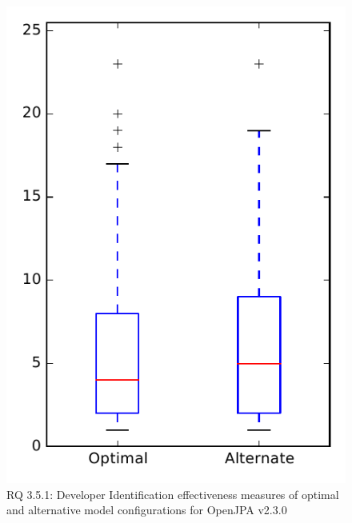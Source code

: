 
\begin{figure}
\centering
\includegraphics[height=0.4\textheight]{figures/combo/dit_rq1_openjpa}
\caption{RQ 3.5.1: Developer Identification effectiveness measures of optimal and alternative model configurations for OpenJPA v2.3.0}
\label{fig:combo:dit:rq1:openjpa}
\end{figure}
